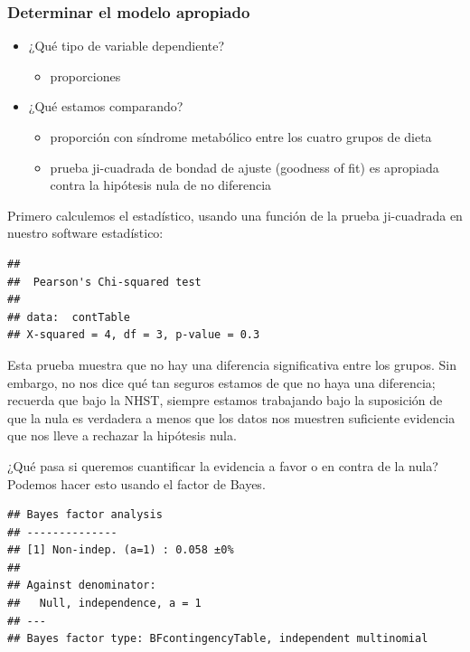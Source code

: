 \documentclass[
  12pt,
]{book}
\providecommand{\tightlist}{%
  \setlength{\itemsep}{0pt}\setlength{\parskip}{0pt}}
\begin{document}
\hypertarget{determinar-el-modelo-apropiado}{%
\subsubsection{Determinar el modelo apropiado}\label{determinar-el-modelo-apropiado}}

\begin{itemize}
\tightlist
\item
  ¿Qué tipo de variable dependiente?

  \begin{itemize}
  \tightlist
  \item
    proporciones
  \end{itemize}
\item
  ¿Qué estamos comparando?

  \begin{itemize}
  \tightlist
  \item
    proporción con síndrome metabólico entre los cuatro grupos de dieta
  \item
    prueba ji-cuadrada de bondad de ajuste (goodness of fit) es apropiada contra la hipótesis nula de no diferencia
  \end{itemize}
\end{itemize}

Primero calculemos el estadístico, usando una función de la prueba ji-cuadrada en nuestro software estadístico:

\begin{verbatim}
## 
##  Pearson's Chi-squared test
## 
## data:  contTable
## X-squared = 4, df = 3, p-value = 0.3
\end{verbatim}

Esta prueba muestra que no hay una diferencia significativa entre los grupos. Sin embargo, no nos dice qué tan seguros estamos de que no haya una diferencia; recuerda que bajo la NHST, siempre estamos trabajando bajo la suposición de que la nula es verdadera a menos que los datos nos muestren suficiente evidencia que nos lleve a rechazar la hipótesis nula.

¿Qué pasa si queremos cuantificar la evidencia a favor o en contra de la nula? Podemos hacer esto usando el factor de Bayes.

\begin{verbatim}
## Bayes factor analysis
## --------------
## [1] Non-indep. (a=1) : 0.058 ±0%
## 
## Against denominator:
##   Null, independence, a = 1 
## ---
## Bayes factor type: BFcontingencyTable, independent multinomial
\end{verbatim}
\end{document}
